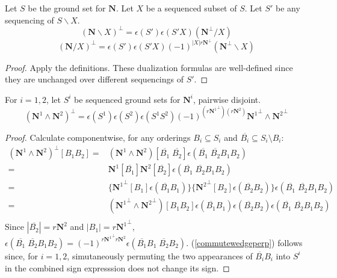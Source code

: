 \documentclass[Unicode]{cedram-alco}
\newcommand{\ext}[1]{\ensuremath{\mathbf{#1}}}
\begin{document}
\begin{prop}\label{delecontdualprop}
  Let $S$ be the ground set for $\ext{N}$.
  Let $X$ be a sequenced subset of $S$.
  Let $S'$ be any sequencing of $S\backslash X$.
    \begin{equation}\label{dualDelete} (\ext{N}\backslash X)^\perp = \epsilon(S')\epsilon(S'X)(\ext{N}^\perp/X)
    \end{equation}
    \begin{equation}\label{dualContract} (\ext{N}/X)^\perp = \epsilon(S')\epsilon(S'X)(-1)^{|X|r\ext{N}^\perp}(\ext{N}^\perp\backslash X)
    \end{equation}
\end{prop}
\begin{proof}
  Apply the definitions.  These dualization formulas are well-defined since they
  are unchanged over different sequencings of $S'$.
\end{proof}


\newcommand{\Nsup}[1]{\ext{N}^{#1}}
\newcommand{\NsupPerp}[1]{{\ext{N}^{#1}}^\perp}

\begin{prop}
  For $i=1, 2$, let $S^{i}$ be sequenced ground sets for $\ext{N}^{i}$, pairwise disjoint.
  \begin{equation}\label{commutewedgeperp}
    (\Nsup{1}\wedge\Nsup{2})^\perp =
    \epsilon(S^{1})\epsilon(S^{2})\epsilon(S^{1}S^{2})(-1)^{(r{\NsupPerp{1}})( r\Nsup{2})}
        \NsupPerp{1}\wedge\NsupPerp{2}
    \end{equation}
\end{prop}
\begin{proof}
  Calculate componentwise, for any orderings
  $B_i\subseteq S_i$ and $\overline{B_i}\subseteq S_i\setminus B_i$:
  \begin{equation*}
    \begin{split}
      (\Nsup{1}\wedge\Nsup{2})^\perp[B_1B_2]=
      &(\Nsup{1}\wedge\Nsup{2})[\overline{B_1}\;\overline{B_2}]
      \epsilon(\overline{B_1}\;\overline{B_2}B_1 B_2)\\
      =&\Nsup{1}[\overline{B_1}]\Nsup{2}[\overline{B_2}]\epsilon(\overline{B_1}\;\overline{B_2}B_1 B_2)\\
    =&\{\NsupPerp{1}[B_1]\epsilon(\overline{B_1}B_1)\}
    \{\NsupPerp{2}[B_2]\epsilon(\overline{B_2}B_2)\}\epsilon(\overline{B_1}\;\overline{B_2}B_1 B_2)\\
    =&(\NsupPerp{1}\wedge\NsupPerp{2})[B_1B_2]\epsilon(\overline{B_1}B_1)\epsilon(\overline{B_2}B_2)\epsilon(\overline{B_1}\;\overline{B_2}B_1 B_2)\\
    \end{split}
  \end{equation*}
  Since $|\overline{B_2}|=r\Nsup{2}$ and $|B_1|=r\NsupPerp{1}$,
$%
  \epsilon(\overline{B_1}\;\overline{B_2}B_1 B_2)=(-1)^{r\NsupPerp{1}r\Nsup{2}}\epsilon(\overline{B_1}B_1\;\overline{B_2} B_2)
$. %
  (\ref{commutewedgeperp}) follows since, for $i=1,2$, simutaneously permuting
  the two appearances of $\overline{B_i}B_i$ into $S^{i}$ in the combined sign expresssion does
  not change its sign.
\end{proof}
\end{document}

